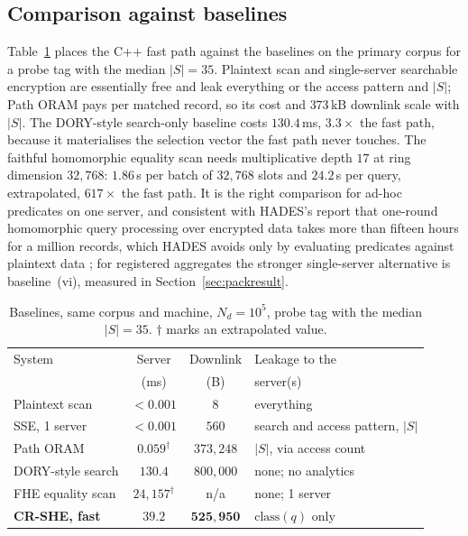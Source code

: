 \documentclass[a4paper,fleqn]{cas-sc}
\begin{document}
\subsection{Comparison against baselines}
Table~\ref{tab:baselines} places the C++ fast path against the baselines on
the primary corpus for a probe tag with the median $|S|=35$. Plaintext scan and
single-server searchable encryption are essentially free and leak everything
or the access pattern and $|S|$; Path ORAM pays per matched record, so its cost
and $373$\,kB downlink scale with $|S|$. The DORY-style search-only baseline
costs $130.4$\,ms, $3.3\times$ the fast path, because it materialises the
selection vector the fast path never touches. The faithful homomorphic
equality scan needs multiplicative depth $17$ at ring dimension $32{,}768$:
$1.86$\,s per batch of $32{,}768$ slots and $24.2$\,s per query, extrapolated,
$617\times$ the fast path. It is the right comparison for ad-hoc predicates on
one server, and consistent with HADES's report that one-round homomorphic query
processing over encrypted data takes more than fifteen hours for a million
records, which HADES avoids only by evaluating predicates against plaintext
data \citep[\S2.4]{liu2025hades}; for registered aggregates the stronger single-server alternative is
baseline~(vi), measured in Section~\ref{sec:packresult}.

\begin{table}[pos=htbp]
\caption{Baselines, same corpus and machine, $N_d=10^5$, probe tag with the
median $|S|=35$. $\dagger$ marks an extrapolated value.}
\label{tab:baselines}
\centering
\footnotesize
\setlength{\tabcolsep}{3pt}
\renewcommand{\arraystretch}{1.2}
\begin{tabular}{@{}lcc>{\raggedright\arraybackslash}p{2.1cm}@{}}
\toprule
System & Server & Downlink & Leakage to the \\
       & (ms)   & (B)      & server(s) \\
\midrule
Plaintext scan        & $<0.001$ & $8$              & everything \\
SSE, 1 server         & $<0.001$ & $560$            & search and access
pattern, $|S|$ \\
Path ORAM             & $0.059^{\dagger}$ & $373{,}248$ & $|S|$, via access
count \\
DORY-style search     & $130.4$  & $800{,}000$      & none; no analytics \\
FHE equality scan     & $24{,}157^{\dagger}$ & n/a & none; 1 server \\
\midrule
\textbf{CR-SHE, fast} & $\mathbf{39.2}$ & $\mathbf{525{,}950}$ &
$\mathrm{class}(q)$ only \\
\bottomrule
\end{tabular}
\end{table}
\end{document}
